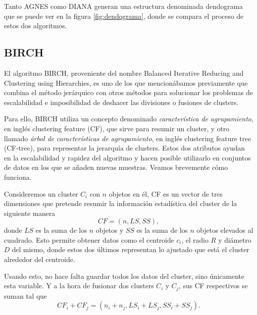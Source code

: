 \documentclass[10pt, a4paper]{article}
\begin{document}
Tanto AGNES como DIANA generan una estructura denominada dendograma que se puede ver en la figura \ref{fig:dendograma}, donde se compara el proceso de estos dos algoritmos.




\subsection{\textbf{BIRCH}} \label{subsec:BIRCH}

\cite{BIRCH, BIRCH 2} El algoritmo BIRCH, proveniente del nombre Balanced Iterative Reducing and Clustering using Hierarchies, es uno de los que mencionábamos previamente que combina el método jerárquico con otros métodos para solucionar los problemas de escalabilidad e imposibilidad de deshacer las divisiones o fusiones de clusters.

Para ello, BIRCH utiliza un concepto denominado \textit{característica de agrupamiento}, en inglés clustering feature (CF), que sirve para resumir un cluster, y otro llamado \textit{árbol de características de agrupamiento}, en inglés clustering feature tree (CF-tree), para representar la jerarquía de clusters. Estos dos atributos ayudan en la escalabilidad y rapidez del algoritmo y hacen posible utilizarlo en conjuntos de datos en los que se añaden nuevas muestras. Veamos brevemente cómo funciona.

Consideremos un cluster $C_i$ con $n$ objetos en él, CF es un vector de tres dimensiones que pretende resumir la información estadística del cluster de la siguiente manera \begin{equation} CF = \left(n, LS, SS \right ), \end{equation} donde $LS$ es la suma de los $n$ objetos y $SS$ es la suma de los $n$ objetos elevados al cuadrado. Esto permite obtener datos como el centroide $c_i$, el radio $R$ y diámetro $D$ del mismo, donde estos dos últimos representan lo ajustado que está el cluster alrededor del centroide. 

Usando esto, no hace falta guardar todos los datos del cluster, sino únicamente esta variable. Y a la hora de fusionar dos clusters $C_i$ y $C_j$, sus CF respectivos se suman tal que \begin{equation}CF_i + CF_j = \left (n_i + n_j, LS_i + LS_j, SS_i + SS_j \right ).\end{equation}
\end{document}
